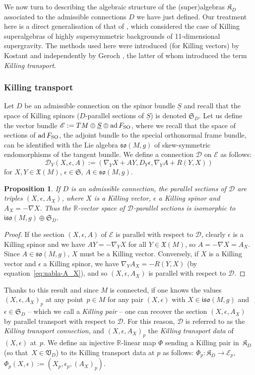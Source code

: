 \documentclass[10pt,a4paper]{amsart}
\numberwithin{equation}{section}
\newtheorem{Proposition}[Theorem]{Proposition}
 { \theoremstyle{definition}
\newtheorem{Definition}[Theorem]{Definition}
\newtheorem{Note}[Theorem]{Note}
\newtheorem{Example}[Theorem]{Example}
\newtheorem{Remark}[Theorem]{Remark} }
\newcommand{\fso}{\mathfrak{so}}
\newcommand{\fiso}{\mathfrak{iso}}
\newcommand{\fX}{\mathfrak{X}}
\newcommand{\fK}{\mathfrak{K}}
\newcommand{\fS}{\mathfrak{S}}
\newcommand{\fV}{\mathfrak{V}}
\newcommand{\RR}{\mathbb{R}}
\newcommand{\eD}{\mathscr{D}}
\newcommand{\eE}{\mathscr{E}}
\newcommand{\Sbundle}{\underline{S}}
\newcommand{\1}{\mathbbm{1}}
\DeclareMathOperator{\ad}{ad}
\begin{document}
We now turn to describing the algebraic structure of the (super)algebras $\fK_D$ associated to the admissible connections $D$ we have just defined. Our treatment here is a direct generalisation of that of \cite{Figueroa-OFarrill2017_1}, which considered the case of Killing superalgebras of highly supersymmetric backgrounds of 11-dimensional supergravity. The methods used here were introduced (for Killing vectors) by Kostant \cite{Kostant1955} and independently by Geroch \cite{Geroch1969}, the latter of whom introduced the term \emph{Killing transport}.

\subsubsection{Killing transport}

Let $D$ be an admissible connection on the spinor bundle $\Sbundle$ and recall that the space of Killing spinors ($D$-parallel sections of $\Sbundle$) is denoted $\fS_D$. Let us define the vector bundle
$\eE := TM\oplus\Sbundle\oplus\ad F_{\rm SO}$,
where we recall that the space of sections of $\ad F_{\rm SO}$, the adjoint bundle to the special orthonormal frame bundle, can be identified with the Lie algebra $\fso(M,g)$ of skew-symmetric endomorphisms of the tangent bundle. We define a connection $\eD$ on $\eE$ as follows:
\[
	\eD_Y(X,\epsilon,A) := (\nabla_Y X + AY,D_Y\epsilon,\nabla_Y A + R(Y,X))
\]
for $X,Y\in\fX(M)$, $\epsilon\in\fS$, $A\in\fso(M,g)$.

\begin{Proposition}\label{prop:killing-transport}
	If $D$ is an admissible connection, the parallel sections of $\eD$ are triples $(X,\epsilon,A_X)$, where $X$ is a Killing vector, $\epsilon$ a Killing spinor and $A_X=-\nabla X$. Thus the $\RR$-vector space of $\eD$-parallel sections is isomorphic to $\fiso(M,g)\oplus\fS_D$.
\end{Proposition}
\begin{proof}
If the section $(X,\epsilon,A)$ of $\eE$ is parallel with respect to $\eD$, clearly $\epsilon$ is a Killing spinor and we have $AY = -\nabla_Y X$ for all $Y\in\fX(M)$, so $A = -\nabla X = A_X$. Since $A\in\fso(M,g)$, $X$ must be a Killing vector. Conversely, if $X$ is a Killing vector and $\epsilon$ a Killing spinor, we have $\nabla_Y A_X = -R(Y,X)$ (by equation~\eqref{eq:nabla-A_X}), and so $(X,\epsilon,A_X)$ is parallel with respect to $\eD$.
\end{proof}

Thanks to this result and since $M$ is connected, if one knows the values $(X,\epsilon,A_X)_p$ at any point~${p\in M}$ for any pair $(X,\epsilon)$ with $X\in\fiso(M,g)$ and $\epsilon\in\fS_D$ -- which we call a \emph{Killing pair} -- one can recover the section $(X,\epsilon,A_X)$ by parallel transport with respect to $\eD$. For this reason, $\eD$ is referred to as the \emph{Killing transport connection}, and $(X,\epsilon,A_X)_p$ the \emph{Killing transport data} of~$(X,\epsilon)$ at~$p$. We define an injective $\RR$-linear map $\Phi$ sending a Killing pair in~$\fK_D$ (so that~${X\in\fV_D}$) to its Killing transport data at $p$ as follows:
$\Phi_p\colon \fK_D\to\eE_p$,
	$\Phi_p(X,\epsilon):=(X_p,\epsilon_p,(A_X)_p)$.
\end{document}
